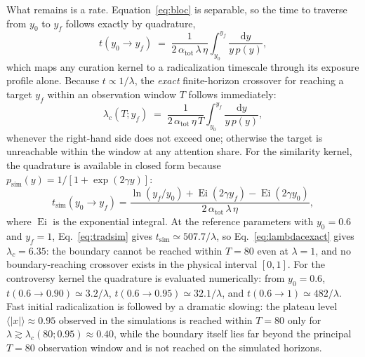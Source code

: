 \documentclass[5p,times,twocolumn]{elsarticle}
\newcommand{\dd}{\mathrm{d}}
\begin{document}
What remains is a rate. Equation~\eqref{eq:bloc} is separable, so the
time to traverse from $y_0$ to $y_f$ follows exactly by quadrature,
\begin{equation}
  t(y_0 \to y_f)
  \;=\;
  \frac{1}{2\,\alpha_{\mathrm{tot}}\,\lambda\,\eta}
  \int_{y_0}^{y_f} \frac{\dd y}{y\, p(y)},
  \label{eq:tradgen}
\end{equation}
which maps any curation kernel to a radicalization timescale through its
exposure profile alone. Because $t \propto 1/\lambda$, the \emph{exact}
finite-horizon crossover for reaching a target $y_f$ within an observation
window $T$ follows immediately:
\begin{equation}
  \lambda_c(T; y_f)
  \;=\;
  \frac{1}{2\,\alpha_{\mathrm{tot}}\,\eta\, T}
  \int_{y_0}^{y_f} \frac{\dd y}{y\, p(y)},
  \label{eq:lambdacexact}
\end{equation}
whenever the right-hand side does not exceed one; otherwise the target is
unreachable within the window at any attention share. For the similarity
kernel, the quadrature is available in closed form because
$p_{\mathrm{sim}}(y)=1/[1+\exp(2\gamma y)]$:
\begin{equation}
  t_{\mathrm{sim}}(y_0\to y_f)
  = \frac{\ln(y_f/y_0)
  + \operatorname{Ei}(2\gamma y_f)
  - \operatorname{Ei}(2\gamma y_0)}
  {2\,\alpha_{\mathrm{tot}}\,\lambda\,\eta},
  \label{eq:tradsim}
\end{equation}
where $\operatorname{Ei}$ is the exponential integral. At the reference
parameters with $y_0=0.6$ and $y_f=1$, Eq.~\eqref{eq:tradsim} gives
$t_{\mathrm{sim}}\simeq507.7/\lambda$, so
Eq.~\eqref{eq:lambdacexact} gives $\lambda_c = 6.35$: the boundary cannot
be reached within $T=80$ even at $\lambda=1$, and no boundary-reaching
crossover exists in the physical interval $[0,1]$. For the controversy
kernel the quadrature is evaluated numerically: from $y_0 = 0.6$,
$t(0.6 \to 0.90) \simeq 3.2/\lambda$,
$t(0.6 \to 0.95) \simeq 32.1/\lambda$, and
$t(0.6 \to 1) \simeq 482/\lambda$. Fast initial radicalization is followed
by a dramatic slowing: the plateau level $\langle|x|\rangle \approx 0.95$
observed in the simulations is reached within $T = 80$ only for
$\lambda \gtrsim \lambda_c(80; 0.95) \approx 0.40$, while the boundary itself lies far beyond the principal $T=80$
observation window and is not reached on the simulated horizons.
\end{document}
